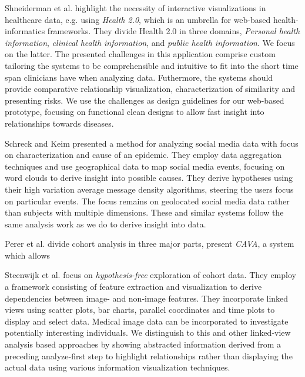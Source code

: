 \documentclass[journal]{style/vgtc} 			          %
\begin{document}
Shneiderman et al. \cite{Shneiderman2013} highlight the necessity of interactive visualizations in healthcare data, e.g. using \emph{Health 2.0}, which is an umbrella for web-based health-informatics frameworks.
They divide Health 2.0 in three domains, \emph{Personal health information}, \emph{clinical health information}, and \emph{public health information}.
We focus on the latter.
The presented challenges in this application comprise custom tailoring the systems to be comprehensible and intuitive to fit into the short time span clinicians have when analyzing data.
Futhermore, the systems should provide comparative relationship visualization, characterization of similarity and presenting risks.
We use the challenges as design guidelines for our web-based prototype, focusing on functional clean designs to allow fast insight into relationships towards diseases.

Schreck and Keim \cite{Schreck} presented a method for analyzing social media data with focus on characterization and cause of an epidemic.
They employ data aggregation techniques and use geographical data to map social media events, focusing on word clouds to derive insight into possible causes.
They derive hypotheses using their high variation average message density algorithms, steering the users focus on particular events.
The focus remains on geolocated social media data rather than subjects with multiple dimensions.
These and similar systems follow the same analysis work as we do to derive insight into data.

Perer et al. divide cohort analysis in three major parts, present \emph{CAVA}, a system which allows 

Steenwijk et al. \cite{Steenwijk} focus on \emph{hypothesis-free} exploration of cohort data.
They employ a framework consisting of feature extraction and visualization to derive dependencies between image- and non-image features.
They incorporate linked views using scatter plots, bar charts, parallel coordinates and time plots to display and select data.
Medical image data can be incorporated to investigate potentially interesting individuals.
We distinguish to this and other linked-view analysis based approaches by showing abstracted information derived from a preceding analyze-first step to highlight relationships rather than displaying the actual data using various information visualization techniques.
\end{document}
